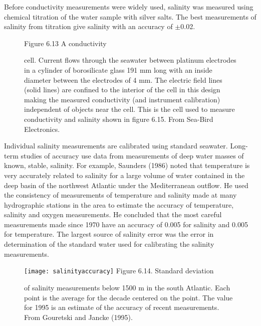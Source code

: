 Before conductivity measurements were widely used, salinity
was measured using chemical titration of the
water sample with silver salts. The best measurements of salinity from titration
give salinity with an accuracy of $\pm$0.02.

\begin{figure}[t!]
\footnotesize
Figure 6.13 A conductivity \rule{0pt}{4ex}cell. Current flows through the seawater between
platinum electrodes in a cylinder of  borosilicate glass 191 mm long with an inside diameter
between the electrodes of 4 mm. The electric field lines (solid lines) are confined to the
interior of the cell in this design making the measured conductivity (and instrument
calibration) independent of objects near the cell. This is the cell used to measure
conductivity and salinity shown in figure 6.15. From Sea-Bird Electronics.
\label{fig:conductivity}
\vspace{-3ex}
\end{figure}

Individual salinity measurements are calibrated using standard
seawater. Long-term studies of accuracy use data from measurements of
deep water masses of known, stable, salinity. For example, Saunders (1986) noted that
temperature is very accurately related to salinity for a large volume of water contained in
the deep basin of the northwest Atlantic under the Mediterranean outflow. He used the
consistency of measurements of temperature and salinity made at many hydrographic
stations in the area to estimate the
accuracy of temperature, salinity and oxygen measurements. He
concluded that the most careful measurements made since 1970 have an accuracy of 0.005 for
salinity and 0.005 for temperature. The largest source of salinity error was the
error in determination of the standard water used for calibrating the salinity measurements.

\begin{figure}[t!]
\texttt{[image: salinityaccuracy]}
\footnotesize
Figure 6.14. Standard deviation \rule{0mm}{3ex}of salinity measurements below 1500 m in the south Atlantic. Each point is the average for the decade centered on the point. The value for 1995 is an estimate of the accuracy of recent measurements. From Gouretski and Jancke (1995).
\label{fig:salinityaccuracy}
\vspace{-4ex}
\end{figure}

